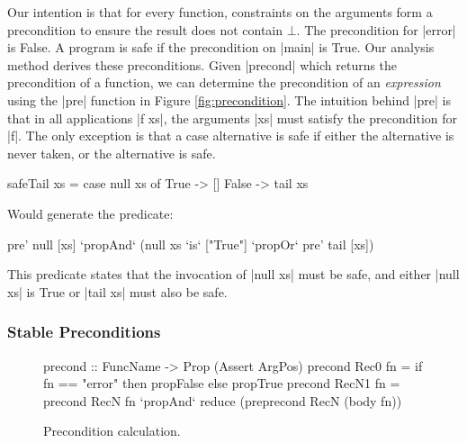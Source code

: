 \documentclass[preprint]{sigplanconf}
\begin{document}
Our intention is that for every function, constraints on the arguments form a precondition to ensure the result does not contain $\bot{}$. The precondition for |error| is False. A program is safe if the precondition on |main| is True. Our analysis method derives these preconditions. Given |precond| which returns the precondition of a function, we can determine the precondition of an \textit{expression} using the |pre| function in Figure \ref{fig:precondition}. The intuition behind |pre| is that in all applications |f xs|, the arguments |xs| must satisfy the precondition for |f|. The only exception is that a case alternative is safe if either the alternative is never taken, or the alternative is safe.

\begin{example}
\label{ex:safeTail}
\begin{code}
safeTail xs = case  null xs of
                    True   -> []
                    False  -> tail xs
\end{code}

\noindent Would generate the predicate:

\ignore\begin{code}
pre' null [xs] `propAnd` (null xs `is` ["True"] `propOr` pre' tail [xs])
\end{code}

This predicate states that the invocation of |null xs| must be safe, and either |null xs| is True or |tail xs| must also be safe.
\end{example}


\subsubsection{Stable Preconditions}
\label{sec:fixp_precond}


\begin{figure}
\ignore\begin{code}
precond  :: FuncName -> Prop (Assert ArgPos)
precond Rec0   fn =  if fn == "error" then propFalse else propTrue
precond RecN1  fn =  precond RecN fn `propAnd`
                     reduce (pre{precond RecN} (body fn))
\end{code}
\begin{comment}
\ignore\begin{code}
for fn `elem` funcs do conds(fn) := propBool (fn /= "error")
loop
    for fn `elem` funcs do
        conds'(fn) := conds(fn) `propAnd` pre preFun (instantiate fn vs)
    if conds' == conds then break
    conds := conds'
end loop
    where
        preFun fn xs = conds(fn)[vs_1/xs_1 .. vs_n/xs_n]
        vs = ... -- free variables
\end{code}
\end{comment}
\caption{Precondition calculation.}
\label{fig:precond_fixp}
\end{figure}
\end{document}
